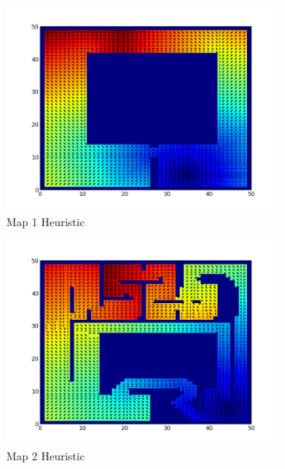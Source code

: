 \documentclass{article}
\begin{document}
\begin{figure}[ht]
    \centering
    \begin{subfigure}[b]{0.45\textwidth}
        \includegraphics[width = \textwidth]{map1value.png}
        \caption{Map 1 Heuristic}
        \label{fig:map1value}
    \end{subfigure}
    \begin{subfigure}[b]{0.45\textwidth}
        \includegraphics[width = \textwidth]{map2value.png}
        \caption{Map 2 Heuristic}
        \label{fig:map2value}
    \end{subfigure}
    \begin{subfigure}[b]{0.45\textwidth}

\end{subfigure}
\end{figure}
\end{document}
